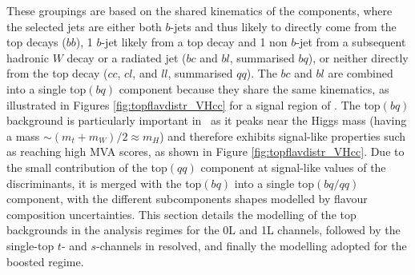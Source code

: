 These groupings are based on the shared kinematics of the components, where the selected jets are either both $b$-jets and thus likely to directly come from the top decays ($bb$), 1 $b$-jet likely from a top decay and 1 non $b$-jet from a subsequent hadronic $W$ decay or a radiated jet ($bc$ and $bl$, summarised $bq$), or neither directly from the top decay ($cc$, $cl$, and $ll$, summarised $qq$). The $bc$ and $bl$ are combined into a single top$(bq)$ component because they share the same kinematics, as illustrated in Figures \ref{fig:topflavdistr_VHcc} for a signal region of \vhc. The top$(bq)$ background is particularly important in \vhc\ as it peaks near the Higgs mass (having a mass $\sim (m_t + m_W) / 2 \approx m_H$) and therefore exhibits signal-like properties such as reaching high MVA scores, as shown in Figure \ref{fig:topflavdistr_VHcc}. Due to the small contribution of the top$(qq)$ component at signal-like values of the discriminants, it is merged with the top$(bq)$ into a single top$(bq/qq)$ component, with the different subcomponents shapes modelled by flavour composition uncertainties. This section details the modelling of the top backgrounds in the analysis regimes for the 0L and 1L channels, followed by the single-top $t$- and $s$-channels in resolved, and finally the modelling adopted for the boosted regime.

